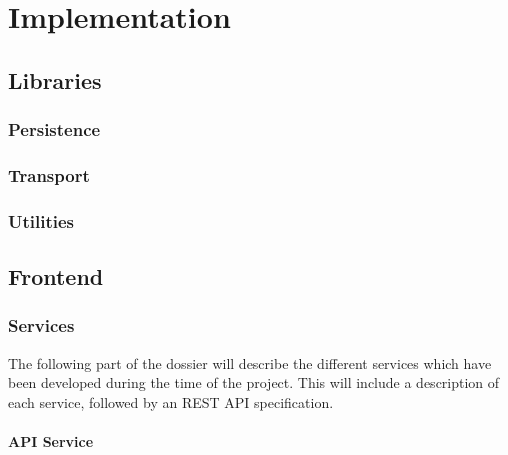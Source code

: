 \chapter{Implementation}\label{ch:implementation}

\lipsum[2-4]

\section{Libraries}\label{sec:libraries}

\subsection{Persistence}\label{subsec:persistence}


\subsection{Transport}\label{subsec:transport}

\subsection{Utilities}\label{subsec:utilities}

\section{Frontend}\label{sec:frontend}

\subsection{Services}\label{subsec:services}

The following part of the dossier will describe the different services which have been developed during the time of the project.
This will include a description of each service, followed by an REST API specification.

\subsubsection{API Service}\label{subsubsec:api-service}

